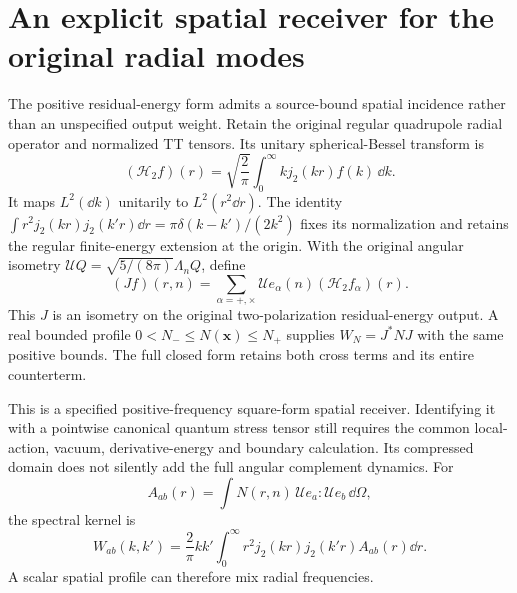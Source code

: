 \section{An explicit spatial receiver for the original radial modes}
The positive residual-energy form admits a source-bound spatial incidence rather than an unspecified output weight. Retain the original regular quadrupole radial operator and normalized TT tensors. Its unitary spherical-Bessel transform is
\[
 (\mathcal H_2 f)(r)=\sqrt{\frac2\pi}\int_0^\infty k j_2(kr)f(k)\,\dd k.
\]
It maps $L^2(\dd k)$ unitarily to $L^2(r^2\dd r)$.
The identity $\int r^2j_2(kr)j_2(k'r)\dd r=\pi\delta(k-k')/(2k^2)$ fixes its normalization and retains the regular finite-energy extension at the origin. With the original angular isometry $\mathcal UQ=\sqrt{5/(8\pi)}\Lambda_nQ$, define
\[
 (Jf)(r,n)=\sum_{\alpha=+,\times}\mathcal Ue_\alpha(n)(\mathcal H_2 f_\alpha)(r).
\]
This $J$ is an isometry on the original two-polarization residual-energy output. A real bounded profile $0<N_-\le N(\mathbf x)\le N_+$ supplies $W_N=J^*NJ$ with the same positive bounds. The full closed form retains both cross terms and its entire counterterm.

This is a specified positive-frequency square-form spatial receiver. Identifying it with a pointwise canonical quantum stress tensor still requires the common local-action, vacuum, derivative-energy and boundary calculation. Its compressed domain does not silently add the full angular complement dynamics. For
\[
 A_{ab}(r)=\int N(r,n)\,\mathcal Ue_a:\mathcal Ue_b\,\dd\Omega,
\]
the spectral kernel is
\[
 W_{ab}(k,k')=\frac2\pi kk'\int_0^\infty
 r^2j_2(kr)j_2(k'r)A_{ab}(r)\dd r.
\]
A scalar spatial profile can therefore mix radial frequencies.

